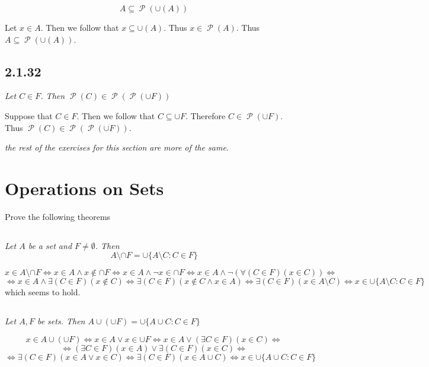 \documentclass[11pt,oneside,titlepage]{book}
\DeclareMathOperator \pow {\mathcal {P}}
\DeclareMathOperator \lra {\Leftrightarrow}
\begin{document}
$$A \subseteq \pow(\cup(A))$$

Let $x \in A$. Then we follow that $x \subseteq \cup(A)$. Thus $x \in \pow(A)$. Thus
$A \subseteq \pow(\cup(A))$.

\subsection*{2.1.32}

\textit{Let $C \in F$. Then $\pow(C) \in \pow(\pow(\cup F))$}

Suppose that $C \in F$. Then we follow that $C \subseteq \cup F$. Therefore $C \in \pow (\cup F)$.
Thus $\pow(C) \in \pow(\pow (\cup F))$.


\textit{the rest of the exercises for this section are more of the same.}

\section{Operations on Sets}

Prove the following theorems

\subsection{}

\textit{Let $A$ be a set and $F \neq \emptyset$. Then}
$$A \setminus \cap F = \cup\{A \setminus C: C \in F\}$$

$$x \in A \setminus \cap F \lra
x \in A \land x \notin \cap F \lra
x \in A \land \neg x \in \cap F \lra
x \in A \land \neg (\forall(C \in F)(x \in C)) \lra
$$
$$ \lra
x \in A \land \exists(C \in F)(x \notin C) \lra
\exists(C \in F)(x \notin C \land x \in A) \lra
\exists(C \in F)(x \in A \setminus C) \lra
x \in \cup\{A \setminus C: C \in F\}
$$
which seems to hold.

\subsection{}

\textit{Let $A, F$ be sets. Then $A \cup (\cup F) = \cup\{A \cup C: C \in F\}$}

$$x \in A \cup (\cup F) \lra x \in A \lor x \in \cup F \lra
x \in A \lor  (\exists C \in F)(x \in C) \lra$$
$$
\lra (\exists C \in F)(x \in A) \lor \exists(C \in F)( x \in C) \lra
$$
$$ \lra 
\exists(C \in F)(x \in A \lor x \in C) \lra
\exists(C \in F)(x \in A \cup C) \lra x \in \cup\{A \cup C: C \in F\}
$$
\end{document}
